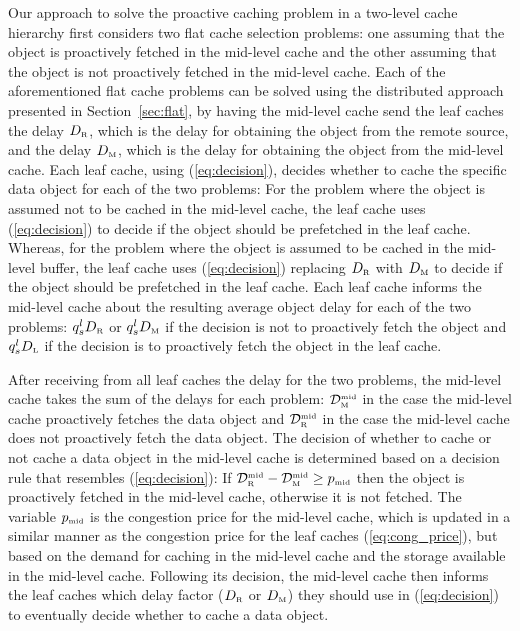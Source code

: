 \documentclass[conference]{IEEEtran}
\newcommand{\M}{\mbox{\tiny M}}
\newcommand{\Leaf}{\mbox{\tiny L}}
\newcommand{\R}{\mbox{\tiny R}}
\newcommand{\mmid}{\mbox{\tiny mid}}
\begin{document}
Our approach to solve the proactive caching problem  in a two-level cache hierarchy first considers two flat cache selection problems: one assuming that the object is proactively fetched in the mid-level cache and the other assuming that the object is not proactively fetched in the mid-level cache.
Each of the aforementioned flat cache problems can be solved using the distributed approach presented in Section~\ref{sec:flat},
by having the mid-level cache send the leaf caches  the delay  $D_{\R}$, which is the delay for obtaining the object from the remote source, and the delay $D_{\M}$, which is the delay for obtaining the object from the mid-level cache.
Each leaf cache, using (\ref{eq:decision}), decides whether to cache the specific data object for each of the two problems:
For the problem where the object is assumed not to be cached in the mid-level cache, the leaf cache uses (\ref{eq:decision}) to decide if the object should be prefetched in the leaf cache. Whereas, for the problem where the object is assumed to be cached in the mid-level buffer, the leaf cache uses (\ref{eq:decision}) replacing $D_{\R}$ with $D_{\M}$ to decide if the object should be prefetched in the leaf cache.
Each leaf cache informs the mid-level cache about the resulting average object delay for each of the two problems: $q^l_s D_{\R}$ or $q^l_s D_{\M}$ if the decision is not to proactively fetch the object  and $q^l_s D_{\Leaf}$ if the decision is to proactively fetch the object in the leaf cache.

After receiving from all leaf caches the  delay for the two problems, the mid-level cache takes the sum of the delays for each problem: $\mathcal{D}^{\mmid}_{\M}$ in the case the mid-level cache  proactively fetches the data object and $\mathcal{D}^{\mmid}_{\R}$ in the case the mid-level cache does not proactively fetch the data object. The decision of whether to cache or not cache a data object in the mid-level cache is determined based on a decision rule that resembles (\ref{eq:decision}):
If $\mathcal{D}^{\mmid}_{\R} - \mathcal{D}^{\mmid}_{\M} \geq p_{\mmid}$ then the object is proactively fetched in the mid-level cache, otherwise it is not fetched. The variable  $p_{\mmid}$ is the congestion price for the mid-level cache, which is updated in a similar manner as the congestion price for the leaf caches (\ref{eq:cong_price}), but based on the demand for caching in the mid-level cache and the storage available in the mid-level cache.
Following its decision, the mid-level cache then informs the leaf caches which delay factor ($D_{\R}$ or $D_{\M}$) they should use in (\ref{eq:decision}) to eventually decide whether to cache a data object.
\end{document}
